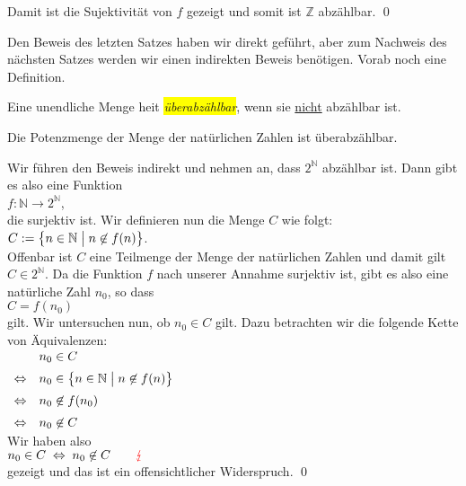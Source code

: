Damit ist die Sujektivit\"{a}t von $f$ gezeigt und somit ist $\mathbb{Z}$ abz\"{a}hlbar.
\qed

Den Beweis des letzten Satzes haben wir direkt gef\"{u}hrt, aber zum Nachweis des n\"{a}chsten Satzes werden wir
einen indirekten Beweis ben\"{o}tigen.  Vorab noch eine Definition.

\begin{Definition} \lb
Eine unendliche Menge hei\3t \colorbox{yellow}{\emph{\"{u}berabz\"{a}hlbar}}, wenn sie \underline{nicht} abz\"{a}hlbar ist.
\end{Definition}

\begin{Satz}
  Die Potenzmenge der Menge der nat\"{u}rlichen Zahlen ist \"{u}berabz\"{a}hlbar.
\end{Satz}

\proof
Wir f\"{u}hren den Beweis indirekt und nehmen an, dass $2^{\mathbb{N}}$ abz\"{a}hlbar ist.  Dann gibt es also
eine Funktion
\\[0.2cm]
\hspace*{1.3cm}
$f: \mathbb{N} \rightarrow 2^{\mathbb{N}}$,
\\[0.2cm]
die surjektiv ist.  Wir definieren nun die Menge $C$ wie folgt:
\\[0.2cm]
\hspace*{1.3cm}
$C := \bigl\{ n \in \mathbb{N} \bigm| n \not\in f(n) \bigr\}$.
\\[0.2cm]
Offenbar ist $C$ eine Teilmenge der Menge der nat\"{u}rlichen Zahlen und damit gilt $C \in 2^{\mathbb{N}}$.
Da die Funktion $f$ nach unserer Annahme surjektiv ist, gibt es also eine nat\"{u}rliche Zahl $n_0$, so
dass 
\\[0.2cm]
\hspace*{1.3cm}
$C = f(n_0)$
\\[0.2cm]
gilt.  Wir untersuchen nun, ob $n_0 \in C$ gilt.  Dazu betrachten wir die folgende Kette von
\"{A}quivalenzen: 
\\[0.2cm]
\hspace*{1.3cm}
$
\begin{array}[t]{cl}
                & n_0 \in C                                                      \\[0.2cm]
\Leftrightarrow & n_0 \in \bigl\{ n \in \mathbb{N} \bigm| n \not\in f(n) \bigr\} \\[0.2cm]
\Leftrightarrow & n_0 \not\in f(n_0)                                             \\[0.2cm]
\Leftrightarrow & n_0 \not\in C                                               
\end{array}
$
\\[0.2cm]
Wir haben also
\\[0.2cm]
\hspace*{1.3cm}
$n_0 \in C \;\Leftrightarrow\; n_0 \not\in C \qquad \color{red}{\lightning}$
\\[0.2cm]
gezeigt und das ist ein offensichtlicher Widerspruch. \qed

